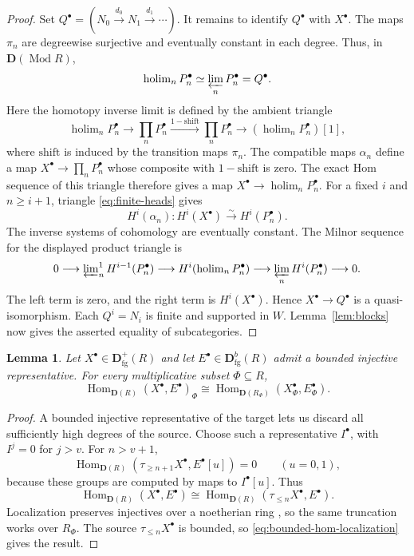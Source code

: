 \documentclass[11pt]{amsart}
\numberwithin{equation}{section}
\newtheorem{lemma}[theorem]{Lemma}
\theoremstyle{definition}
\theoremstyle{remark}
\DeclareMathOperator{\Hom}{Hom}
\newcommand{\D}{\mathbf D}
\newcommand{\fg}{\mathrm{fg}}
\newcommand{\Mod}{\operatorname{Mod}}
\begin{document}
\begin{proof}
Set $Q^{\bullet}=(N_0\xrightarrow{d_0}N_1\xrightarrow{d_1}\cdots)$.
It remains to identify $Q^{\bullet}$ with $X^{\bullet}$.
The maps $\pi_n$ are degreewise surjective and eventually constant
in each degree. Thus, in $\D(\Mod R)$,
\[
 \operatorname{holim}_nP_n^{\bullet}\simeq\varprojlim_nP_n^{\bullet}=Q^{\bullet}.
\]
Here the homotopy inverse limit is defined by the ambient triangle
\[
 \operatorname{holim}_nP_n^{\bullet}\longrightarrow\prod_nP_n^{\bullet}
 \xrightarrow{1-\mathrm{shift}}\prod_nP_n^{\bullet}\longrightarrow
 (\operatorname{holim}_nP_n^{\bullet})[1],
\]
where $\mathrm{shift}$ is induced by the transition maps $\pi_n$.
The compatible maps $\alpha_n$ define a map
$X^{\bullet}\to\prod_nP_n^{\bullet}$ whose composite with
$1-\mathrm{shift}$ is zero. The exact Hom sequence of this triangle
therefore gives a map $X^{\bullet}\to\operatorname{holim}_nP_n^{\bullet}$.
For a fixed $i$ and $n\geq i+1$, triangle
\eqref{eq:finite-heads} gives
\[
 H^i(\alpha_n):H^i(X^\bullet)\xrightarrow{\sim}H^i(P_n^\bullet).
\]
The inverse systems of cohomology are eventually constant. The Milnor
sequence for the displayed product triangle is
\[
 0\longrightarrow\varprojlim\nolimits_n^1 H^{i-1}(P_n^\bullet)
 \longrightarrow H^i(\operatorname{holim}_nP_n^\bullet)
 \longrightarrow\varprojlim_nH^i(P_n^\bullet)\longrightarrow0.
\]
The left term is zero, and the right term is $H^i(X^\bullet)$.
Hence $X^\bullet\to Q^\bullet$ is a quasi-isomorphism.
Each $Q^i=N_i$ is finite and supported in $W$.
Lemma~\ref{lem:blocks} now gives the asserted equality of subcategories.
\end{proof}

\begin{lemma}
\label{lem:finite-id-localization}
Let $X^{\bullet}\in\D^+_{\fg}(R)$ and let $E^{\bullet}\in\D^b_{\fg}(R)$ admit a bounded
injective representative. For every multiplicative subset $\Phi\subseteq R$,
\begin{equation}\label{eq:finite-id-localization}
 \Hom_{\D(R)}(X^{\bullet},E^{\bullet})_\Phi
 \cong\Hom_{\D(R_\Phi)}(X_\Phi^{\bullet},E_\Phi^{\bullet}).
\end{equation}
\end{lemma}
\begin{proof}
A bounded injective representative of the target lets us discard
all sufficiently high degrees of the source. Choose such a representative
$I^{\bullet}$, with $I^j=0$ for $j>v$. For $n>v+1$,
\[
 \Hom_{\D(R)}(\tau_{\geq n+1}X^{\bullet},E^{\bullet}[u])=0\qquad(u=0,1),
\]
because these groups are computed by maps to $I^{\bullet}[u]$. Thus
\[
 \Hom_{\D(R)}(X^{\bullet},E^{\bullet})
 \cong\Hom_{\D(R)}(\tau_{\leq n}X^{\bullet},E^{\bullet}).
\]
Localization preserves injectives over a noetherian ring
\cite[Tag~0A6I]{Stacks}, so the same truncation works over $R_\Phi$.
The source $\tau_{\leq n}X^{\bullet}$ is bounded, so
\eqref{eq:bounded-hom-localization} gives the result.
\end{proof}
\end{document}
